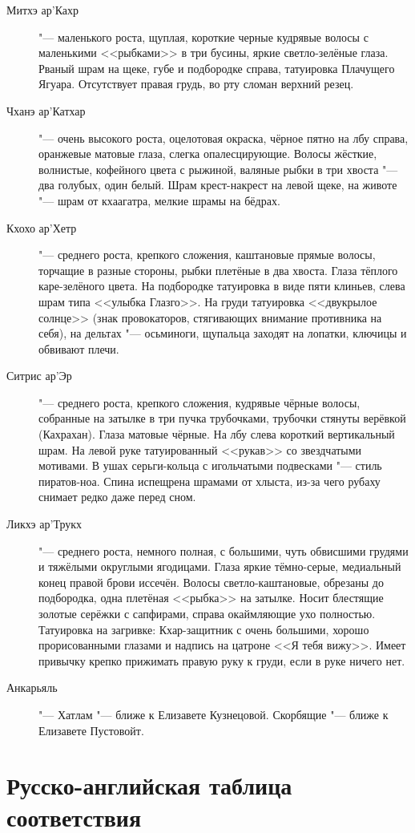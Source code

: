 \documentclass[a4paper,10pt,fleqn]{book}
\begin{document}
\begin{description}
\item[Митхэ ар'Кахр] "--- маленького роста, щуплая, короткие черные кудрявые волосы с маленькими <<рыбками>> в три бусины, яркие светло-зелёные глаза.
Рваный шрам на щеке, губе и подбородке справа, татуировка Плачущего Ягуара.
Отсутствует правая грудь, во рту сломан верхний резец.
\item[Чханэ ар'Катхар] "--- очень высокого роста, оцелотовая окраска, чёрное пятно на лбу справа, оранжевые матовые глаза, слегка опалесцирующие.
Волосы жёсткие, волнистые, кофейного цвета с рыжиной, валяные рыбки в три хвоста "--- два голубых, один белый.
Шрам крест-накрест на левой щеке, на животе "--- шрам от кхаагатра, мелкие шрамы на бёдрах.
\item[Кхохо ар'Хетр] "--- среднего роста, крепкого сложения, каштановые прямые волосы, торчащие в разные стороны, рыбки плетёные в два хвоста.
Глаза тёплого каре-зелёного цвета.
На подбородке татуировка в виде пяти клиньев, слева шрам типа <<улыбка Глазго>>.
На груди татуировка <<двукрылое солнце>> (знак провокаторов, стягивающих внимание противника на себя), на дельтах "--- осьминоги, щупальца заходят на лопатки, ключицы и обвивают плечи.
\item[Ситрис ар'Эр] "--- среднего роста, крепкого сложения, кудрявые чёрные волосы, собранные на затылке в три пучка трубочками, трубочки стянуты верёвкой (Кахрахан).
Глаза матовые чёрные.
На лбу слева короткий вертикальный шрам.
На левой руке татуированный <<рукав>> со звездчатыми мотивами.
В ушах серьги-кольца с игольчатыми подвесками "--- стиль пиратов-ноа.
Спина испещрена шрамами от хлыста, из-за чего рубаху снимает редко даже перед сном.
\item[Ликхэ ар'Трукх] "--- среднего роста, немного полная, с большими, чуть обвисшими грудями и тяжёлыми округлыми ягодицами.
Глаза яркие тёмно-серые, медиальный конец правой брови иссечён.
Волосы светло-каштановые, обрезаны до подбородка, одна плетёная <<рыбка>> на затылке.
Носит блестящие золотые серёжки с сапфирами, справа окаймляющие ухо полностью.
Татуировка на загривке: Кхар-защитник с очень большими, хорошо прорисованными глазами и надпись на цатроне <<Я тебя вижу>>.
Имеет привычку крепко прижимать правую руку к груди, если в руке ничего нет.
\item[Анкарьяль] "--- Хатлам "--- ближе к Елизавете Кузнецовой.
Скорбящие "--- ближе к Елизавете Пустовойт.
\end{description}

\section{Русско-английская таблица соответствия}
\end{document}
